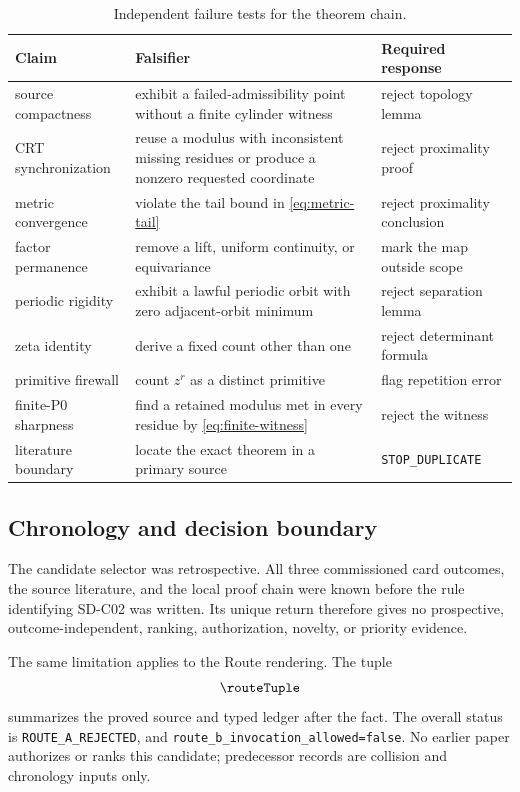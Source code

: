 \begin{table}[H]
\centering
\small
\caption{Independent failure tests for the theorem chain.}
\label{tab:falsifiers}
\begin{tabularx}{\textwidth}{@{}>{\raggedright\arraybackslash}p{}
  >{\raggedright\arraybackslash}X
  >{\raggedright\arraybackslash}p{}@{}}
\toprule
Claim & Falsifier & Required response \\
\midrule
source compactness & exhibit a failed-admissibility point without a finite
cylinder witness & reject topology lemma \\
CRT synchronization & reuse a modulus with inconsistent missing residues or
produce a nonzero requested coordinate & reject proximality proof \\
metric convergence & violate the tail bound in \cref{eq:metric-tail}
& reject proximality conclusion \\
factor permanence & remove a lift, uniform continuity, or equivariance
& mark the map outside scope \\
periodic rigidity & exhibit a lawful periodic orbit with zero adjacent-orbit
minimum & reject separation lemma \\
zeta identity & derive a fixed count other than one
& reject determinant formula \\
primitive firewall & count \(z^r\) as a distinct primitive
& flag repetition error \\
finite-P0 sharpness & find a retained modulus met in every residue by
\cref{eq:finite-witness} & reject the witness \\
literature boundary & locate the exact theorem in a primary source
& \texttt{STOP\_DUPLICATE} \\
\bottomrule
\end{tabularx}
\end{table}

\subsection{Chronology and decision boundary}

The candidate selector was retrospective.  All three commissioned card
outcomes, the source literature, and the local proof chain were known before
the rule identifying SD-C02 was written.  Its unique return therefore gives
no prospective, outcome-independent, ranking, authorization, novelty, or
priority evidence.

The same limitation applies to the Route rendering.  The tuple
\[
  \routeTuple
\]
summarizes the proved source and typed ledger after the fact.  The overall
status is \texttt{ROUTE\_A\_REJECTED}, and
\texttt{route\_b\_invocation\_allowed=false}.  No earlier paper authorizes or
ranks this candidate; predecessor records are collision and chronology
inputs only.

